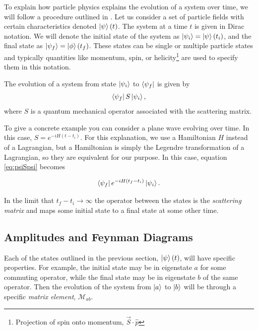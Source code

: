To explain how particle physics explains the evolution of a system over time, we will follow a procedure outlined in \cite{Maggiore5.1:2005}. Let us consider a set of particle fields with certain characteristics denoted $\ket{\psi}\left(t\right)$. The system at a time $t$ is given in Dirac notation\cite{Schwabl:2002}. We will denote the initial state of the system as $\ket{\psi_{i}} = \ket{\psi}\left(t_{i}\right)$, and the final state as $\ket{\psi_{f}} = \ket{\phi}\left(t_{f}\right)$. These states can be single or multiple particle states and typically quantities like momentum, spin, or helicity\footnote{Projection of spin onto momentum, $\vec{S}\cdot\hat{p}$} are used to specify them in this notation.

The evolution of a system from state $\ket{\psi_{i}}$ to $\bra{\psi_{f}}$ is given by
\begin{equation}
\label{eq:psiSpsi}
\bra{\psi_{f}}S\ket{\psi_{i}},
\end{equation}
where $S$ is a quantum mechanical operator associated with the scattering matrix. 

To give a concrete example you can consider a plane wave evolving over time. In this case, $S = e^{-iH\left(t-t_{i}\right)}$. For this explanation, we use a Hamiltonian $H$ instead of a Lagrangian, but a Hamiltonian is simply the Legendre transformation of a Lagrangian, so they are equivalent for our purpose. In this case, equation \eqref{eq:psiSpsi} becomes

\begin{equation}
\label{eq:WaveSmatrix}
\bra{\psi_{f}}e^{-iH\left(t_{f}-t_{i}\right)}\ket{\psi_{i}}.
\end{equation}

In the limit that $t_{f} - t_{i} \to \infty$ the operator between the states is the \textit{scattering matrix} and maps some initial state to a final state at some other time. 

\subsection{Amplitudes and Feynman Diagrams}
\label{sec:Amplitudes}

Each of the states outlined in the previous section, $\ket{\psi}\left(t\right)$, will have specific properties. For example, the initial state may be in eigenstate $a$ for some commuting operator, while the final state may be in eigenstate $b$ of the same operator. Then the evolution of the system from $\ket{a}$ to $\ket{b}$ will be through a specific \textit{matrix element}, $\mathcal{M}_{ab}$.

